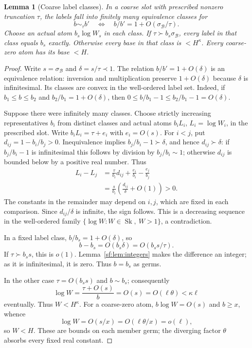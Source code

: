 \documentclass[11pt]{article}
\newtheorem{lemma}[theorem]{Lemma}
\theoremstyle{definition}
\theoremstyle{remark}
\newcommand{\Sk}{\operatorname{Sk}}
\newcommand{\calB}{\mathcal B}
\numberwithin{equation}{section}
\begin{document}
\begin{lemma}[Coarse label classes]\label{l-lem:labels}
In a coarse slot with prescribed nonzero truncation $\tau$, the
labels fall into finitely many equivalence classes for
\begin{equation}
 b\sim_\tau b'\quad\Longleftrightarrow\quad
               b/b'=1+O(\sigma_{\calB}/\tau).
 \label{l-eq-4.2}
\end{equation}
Choose an actual atom $b_s\log W_s$ in each class.
If $\tau\succ b_s\sigma_{\calB}$, every label in that class
equals $b_s$ exactly.
Otherwise every base in that class is $<H^\kappa$.
Every coarse-zero atom has its base $<H$.
\end{lemma}
\begin{proof}
Write $s=\sigma_{\calB}$ and $\delta=s/\tau\prec1$.
The relation $b/b'=1+O(\delta)$ is an equivalence relation:
inversion and multiplication preserve $1+O(\delta)$ because
$\delta$ is infinitesimal. Its classes are convex in the
well-ordered label set. Indeed, if $b_1\le b\le b_2$ and
$b_2/b_1=1+O(\delta)$, then
$0\le b/b_1-1\le b_2/b_1-1=O(\delta)$.

Suppose there were infinitely many classes. Choose strictly
increasing representatives $b_i$ from distinct classes and actual
atoms $b_iL_i$, $L_i=\log W_i$, in the prescribed slot. Write
$b_iL_i=\tau+e_i$ with $e_i=O(s)$. For $i<j$, put
$d_{ij}=1-b_i/b_j>0$. Inequivalence implies
$b_j/b_i-1\succ\delta$, and hence $d_{ij}\succ\delta$:
if $b_j/b_i-1$ is infinitesimal this follows by division by
$b_j/b_i\sim1$; otherwise $d_{ij}$ is bounded below by a
positive real number. Thus
\begin{equation}
 \begin{aligned}
 L_i-L_j
 &=\frac{\tau}{b_i}d_{ij}
       +\frac{e_i}{b_i}-\frac{e_j}{b_j}\\
 &=\frac{s}{b_i}\left(\frac{d_{ij}}{\delta}+O(1)\right)>0.
 \end{aligned}
 \label{label-decrease}
\end{equation}
The constants in the remainder may depend on $i,j$, which are
fixed in each comparison. Since $d_{ij}/\delta$ is infinite,
the sign follows. This is a decreasing sequence in the
well-ordered family $\{\log W:W\in\Sk,\ W>1\}$, a contradiction.

In a fixed label class, $b/b_s=1+O(\delta)$, so
\[
 b-b_s=O(b_s\delta)=O(b_ss/\tau).
\]
If $\tau\succ b_ss$, this is $o(1)$.
Lemma~\ref{sf:lem:integers} makes the difference an integer;
as it is infinitesimal, it is zero. Thus $b=b_s$ as germs.

In the other case $\tau=O(b_ss)$ and $b\sim b_s$; consequently
\[
 \log W=\frac{\tau+O(s)}b=O(s)=O(\ell\theta)
                              <\kappa\ell
\]
eventually. Thus $W<H^\kappa$.
For a coarse-zero atom, $b\log W=O(s)$ and $b\ge x$, whence
\[
 \log W=O(s/x)=O(\ell\theta/x)=o(\ell),
\]
so $W<H$. These are bounds on each member germ; the diverging
factor $\theta$ absorbs every fixed real constant.
\end{proof}
\end{document}
